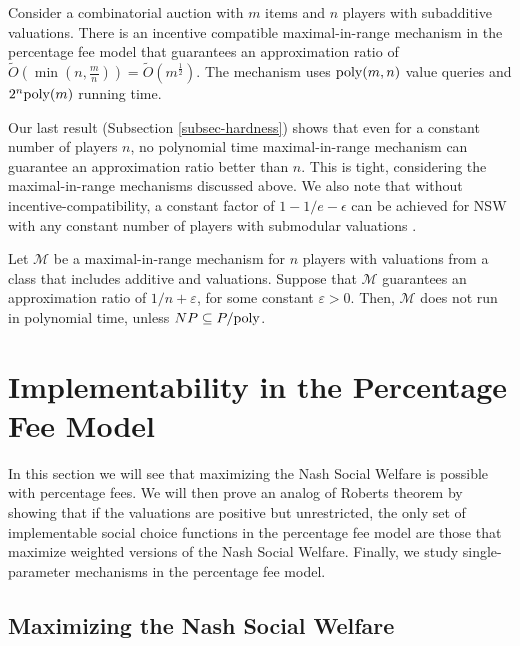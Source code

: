 \documentclass{article}
\newcommand{\eps}{\varepsilon}
\newcommand{\poly}{\hbox{poly}}
\newcommand{\cM}{{\mathcal M}}
\begin{document}
\begin{theorem*}
Consider a combinatorial auction with $m$ items and $n$ players with subadditive valuations. There is an incentive compatible maximal-in-range mechanism in the percentage fee model that guarantees an approximation ratio of $\tilde O(\min(n,\frac m n))=\tilde O(m^{\frac 1 2})$. The mechanism uses $\poly(m,n)$ value queries and $2^n \poly(m)$ running time.
\end{theorem*}

Our last result (Subsection \ref{subsec-hardness}) shows that even for a constant number of players $n$, no polynomial time maximal-in-range mechanism can guarantee an approximation ratio better than $n$. This is tight, considering the maximal-in-range mechanisms discussed above. We also note that without incentive-compatibility, a constant factor of $1-1/e-\epsilon$ can be achieved for NSW with any constant number of players with submodular valuations \cite{GKK20}.


\begin{theorem*}
Let $\cM$ be a maximal-in-range mechanism for $n$ players with valuations from a class that includes additive and valuations. Suppose that $\cM$ guarantees an approximation ratio of $1/n+\eps$, for some constant $\eps>0$. Then, $\cM$ does not run in polynomial time, unless $NP\subseteq P/\poly$.
\end{theorem*}



\section{Implementability in the Percentage Fee Model}

In this section we will see that maximizing the Nash Social Welfare is possible with percentage fees. We will then prove an analog of Roberts theorem by showing that if the valuations are positive but unrestricted, the only set of implementable social choice functions in the percentage fee model are those that maximize weighted versions of the Nash Social Welfare. Finally, we study single-parameter mechanisms in the percentage fee model.

\subsection{Maximizing the Nash Social Welfare}\label{subsec-exact-nash}
\end{document}
